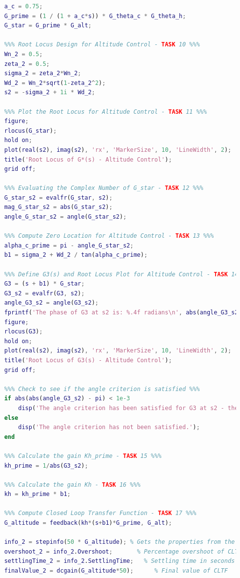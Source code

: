 \documentclass[stu, a4paper, 12pt, floatsintext]{apa7}
\numberwithin{figure}{section}
\numberwithin{table}{section}
\numberwithin{equation}{section}
\begin{document}
\begin{lstlisting}[language=MATLAB]
    %%% Define Altitude Loop Transfer Functions - TASK 9 %%%
    a_c = 0.75;
    G_prime = (1 / (1 + a_c*s)) * G_theta_c * G_theta_h; 
    G_star = G_prime * G_alt;
    
    %%% Root Locus Design for Altitude Control - TASK 10 %%%
    Wn_2 = 0.5;
    zeta_2 = 0.5;
    sigma_2 = zeta_2*Wn_2;
    Wd_2 = Wn_2*sqrt(1-zeta_2^2);
    s2 = -sigma_2 + 1i * Wd_2;
    
    %%% Plot the Root Locus for Altitude Control - TASK 11 %%%
    figure;
    rlocus(G_star);
    hold on;
    plot(real(s2), imag(s2), 'rx', 'MarkerSize', 10, 'LineWidth', 2);
    title('Root Locus of G*(s) - Altitude Control');
    grid off;
    
    %%% Evaluating the Complex Number of G_star - TASK 12 %%%
    G_star_s2 = evalfr(G_star, s2);
    mag_G_star_s2 = abs(G_star_s2);
    angle_G_star_s2 = angle(G_star_s2);
    
    %%% Compute Zero Location for Altitude Control - TASK 13 %%%
    alpha_c_prime = pi - angle_G_star_s2;
    b1 = sigma_2 + Wd_2 / tan(alpha_c_prime);
    
    %%% Define G3(s) and Root Locus Plot for Altitude Control - TASK 14 %%%
    G3 = (s + b1) * G_star;
    G3_s2 = evalfr(G3, s2);
    angle_G3_s2 = angle(G3_s2);
    fprintf('The phase of G3 at s2 is: %.4f radians\n', abs(angle_G3_s2));
    figure;
    rlocus(G3);
    hold on;
    plot(real(s2), imag(s2), 'rx', 'MarkerSize', 10, 'LineWidth', 2);
    title('Root Locus of G3(s) - Altitude Control');
    grid off;
    
    %%% Check to see if the angle criterion is satisfied %%%
    if abs(abs(angle_G3_s2) - pi) < 1e-3
        disp('The angle criterion has been satisfied for G3 at s2 - the phase is approximately pi.');
    else
        disp('The angle criterion has not been satisfied.');
    end
    
    %%% Calculate the gain Kh_prime - TASK 15 %%%
    kh_prime = 1/abs(G3_s2);
    
    %%% Calculate the gain Kh - TASK 16 %%%
    kh = kh_prime * b1;
    
    %%% Compute Closed Loop Transfer Function - TASK 17 %%%
    G_altitude = feedback(kh*(s+b1)*G_prime, G_alt);
    
    info_2 = stepinfo(50 * G_altitude); % Gets the properties from the CLTF with a step change of 5 degrees.
    overshoot_2 = info_2.Overshoot;       % Percentage overshoot of CLTF
    settlingTime_2 = info_2.SettlingTime;   % Settling time in seconds of CLTF
    finalValue_2 = dcgain(G_altitude*50);      % Final value of CLTF
    

\end{lstlisting}
\end{document}
